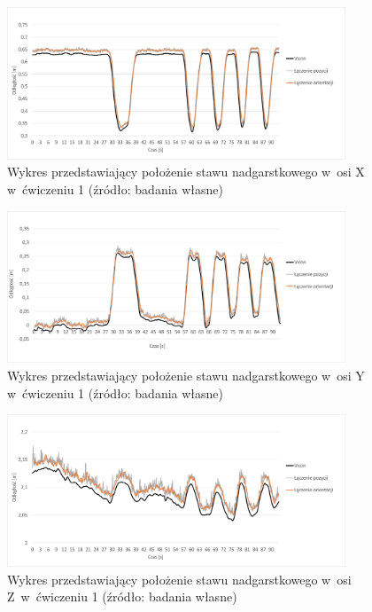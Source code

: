 \begin{figure}[!htb]
	\centering
	\includegraphics[width=0.9\textwidth]{images/100/Slide4.png}
	\caption{Wykres przedstawiający położenie stawu nadgarstkowego w~osi X w~ćwiczeniu 1 (źródło: badania własne)}
	\label{fig:experiments:first:wristX}
\end{figure}
\begin{figure}[!htb]
	\centering
	\includegraphics[width=0.9\textwidth]{images/100/Slide5.png}
	\caption{Wykres przedstawiający położenie stawu nadgarstkowego w~osi Y w~ćwiczeniu 1 (źródło: badania własne)}
	\label{fig:experiments:first:wristY}
\end{figure}
\begin{figure}[!htb]
	\centering
	\includegraphics[width=0.9\textwidth]{images/100/Slide6.png}
	\caption{Wykres przedstawiający położenie stawu nadgarstkowego w~osi Z~w~ćwiczeniu 1 (źródło: badania własne)}
	\label{fig:experiments:first:wristZ}
\end{figure}
			
